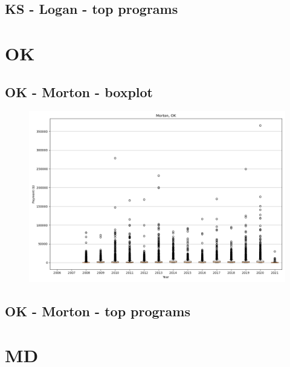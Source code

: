 \subsection*{KS - Logan - top programs}

\newpage
\section*{OK}
\subsection*{OK - Morton - boxplot}
\begin{figure}[h]
\centering
\includegraphics[width=7in]{../output/boxplots/counties/Morton-OK_boxplot.png}
\end{figure}


\subsection*{OK - Morton - top programs}

\newpage
\section*{MD}

